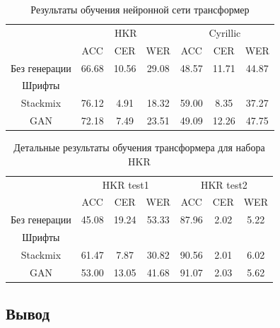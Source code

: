 \begin{table}[h!]
    \centering
    \begin{tabular}{|c|c|c|c|c|c|c|}
        \hline
              & \multicolumn{3}{c|}{HKR} & \multicolumn{3}{c|}{Cyrillic} \\
        \cline{2-7}
                         &  ACC  &  CER  &  WER  &  ACC  &  CER  &  WER  \\
        \hline
        \hline
        Без генерации    & 66.68 & 10.56 & 29.08 & 48.57 & 11.71 & 44.87 \\
        Шрифты           &       &       &       &       &       &       \\
        Stackmix         & 76.12 & 4.91  & 18.32 & 59.00 & 8.35  & 37.27 \\
        GAN              & 72.18 & 7.49  & 23.51 & 49.09 & 12.26 & 47.75 \\
        \hline
    \end{tabular}
    \caption{Результаты обучения нейронной сети трансформер}
    \label{tab:transformer_htr_results}
\end{table}

\begin{table}[h!]
    \centering
    \begin{tabular}{|c|c|c|c|c|c|c|}
        \hline
        & \multicolumn{3}{c|}{HKR test1} & \multicolumn{3}{c|}{HKR test2} \\
        \cline{2-7}
                         &  ACC  &  CER  &  WER  &  ACC  &  CER  &  WER  \\
        \hline
        \hline
        Без генерации    & 45.08 & 19.24 & 53.33 & 87.96 & 2.02  & 5.22  \\
        Шрифты           &       &       &       &       &       &       \\
        Stackmix         & 61.47 & 7.87  & 30.82 & 90.56 & 2.01  & 6.02  \\
        GAN              & 53.00 & 13.05 & 41.68 & 91.07 & 2.03  & 5.62  \\
        \hline
    \end{tabular}
    \caption{Детальные результаты обучения трансформера для набора HKR}
    \label{tab:transformer_htr_results_hkr}
\end{table}


\subsection{Вывод}
\label{subsec:experiment_conclusion}

